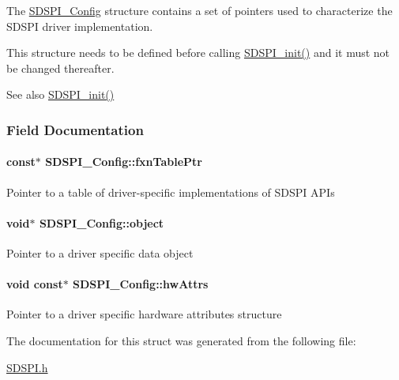 The \hyperlink{struct_s_d_s_p_i___config}{S\+D\+S\+P\+I\+\_\+\+Config} structure contains a set of pointers used to characterize the S\+D\+S\+P\+I driver implementation.

This structure needs to be defined before calling \hyperlink{_s_d_s_p_i_8h_a83cfcebe7875d9d8b5e08e57e6785ae6}{S\+D\+S\+P\+I\+\_\+init()} and it must not be changed thereafter.

\begin{DoxySeeAlso}{See also}
\hyperlink{_s_d_s_p_i_8h_a83cfcebe7875d9d8b5e08e57e6785ae6}{S\+D\+S\+P\+I\+\_\+init()} 
\end{DoxySeeAlso}


\subsubsection{Field Documentation}
\paragraph[{fxn\+Table\+Ptr}]{ const$\ast$ S\+D\+S\+P\+I\+\_\+\+Config\+::fxn\+Table\+Ptr}\label{struct_s_d_s_p_i___config_a5e816ddb1d2229f1016b99cba4153be0}
Pointer to a table of driver-\/specific implementations of S\+D\+S\+P\+I A\+P\+Is 
\paragraph[{object}]{\setlength{\rightskip}{0pt plus 5cm}void$\ast$ S\+D\+S\+P\+I\+\_\+\+Config\+::object}\label{struct_s_d_s_p_i___config_a019c899a3fc8e190998de085e900e5b6}
Pointer to a driver specific data object 
\paragraph[{hw\+Attrs}]{\setlength{\rightskip}{0pt plus 5cm}void const$\ast$ S\+D\+S\+P\+I\+\_\+\+Config\+::hw\+Attrs}\label{struct_s_d_s_p_i___config_a65d8bf130f6e7f1fe0ae550bf52df01f}
Pointer to a driver specific hardware attributes structure 

The documentation for this struct was generated from the following file\+:\begin{DoxyCompactItemize}
\item 
\hyperlink{_s_d_s_p_i_8h}{S\+D\+S\+P\+I.\+h}\end{DoxyCompactItemize}
